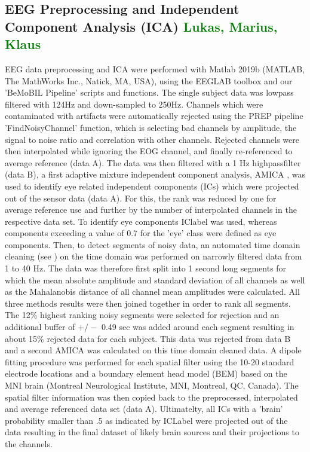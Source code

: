 \subsection{EEG Preprocessing and Independent Component Analysis (ICA) \textcolor{green}{Lukas, Marius, Klaus}}
EEG data preprocessing and ICA were performed with Matlab 2019b (MATLAB, The MathWorks Inc., Natick, MA, USA), using the EEGLAB toolbox \cite{Delorme2004a} and our 'BeMoBIL Pipeline' scripts and functions. The single subject data was lowpass filtered with 124Hz and down-sampled to 250Hz. Channels which were contaminated with artifacts were automatically rejected using the PREP pipeline \cite{Bigdely-Shamlo2015} 'FindNoisyChannel' function, which is selecting bad channels by amplitude, the signal to noise ratio and correlation with other channels. Rejected channels were then interpolated while ignoring the EOG channel, and finally re-referenced to average reference (data A). The data was then filtered with a 1 Hz highpassfilter (data B), a first adaptive mixture independent component analysis, AMICA \cite{Palmer2011}, was used to identify eye related independent components (ICs) which were projected out of the sensor data (data A). For this, the rank was reduced by one for average reference use and further by the number of interpolated channels in the respective data set. To identify eye components IClabel  \cite{Pion-Tonachini2019} was used, whereas components exceeding a value of 0.7 for the 'eye' class were defined as eye components. Then, to detect segments of noisy data, an automated time domain cleaning (see \citet{Gramann2018}) on the time domain was performed on narrowly filtered data from 1 to 40 Hz. The data was therefore first split into 1 second long segments for which the mean absolute amplitude and standard deviation of all channels as well as the Mahalanobis distance of all channel mean amplitudes were calculated. All three methods results were then joined together in order to rank all segments. The 12\% highest ranking noisy segments were selected for rejection and an additional buffer of $+/-$ 0.49 sec was added around each segment resulting in about 15\% rejected data for each subject. This data was rejected from data B and a second AMICA was calculated on this time domain cleaned data. A dipole fitting procedure was performed for each spatial filter using the 10-20 standard electrode locations and a boundary element head model (BEM) based on the MNI brain (Montreal Neurological Institute, MNI, Montreal, QC, Canada). The spatial filter information was then copied back to the preprocessed, interpolated and average referenced data set (data A). Ultimatelty, all ICs with a 'brain' probability smaller than .5 as indicated by ICLabel were projected out of the data resulting in the final dataset of likely brain sources and their projections to the channels.

